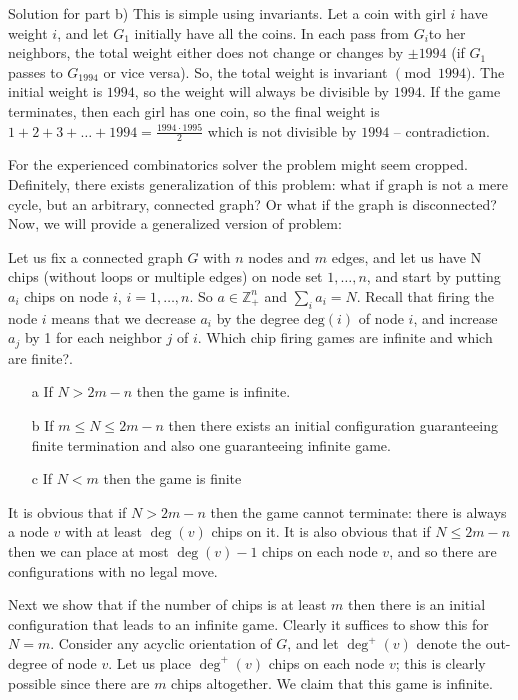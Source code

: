 Solution for part b) This is simple using invariants. Let a coin with girl $i$ have weight $i$, and let $G_1$ initially have all the coins. In each pass from $G_i$to her neighbors, the total weight either does not change or changes by $\pm 1994$ (if $G_1$ passes to $G_{1994}$ or vice versa). So, the total weight is invariant $\pmod{1994}$. The initial weight is $1994$, so the weight will always be divisible by $1994$. If the game terminates, then each girl has one coin, so the final weight is $1+2+3+\dots+1994 = \frac{1994\cdot1995}{2}$ which is not divisible by $1994$ -- contradiction.

For the experienced combinatorics solver the problem might seem cropped. Definitely, there exists generalization of this problem: what if graph is not a mere cycle, but an arbitrary, connected graph? Or what if the graph is disconnected? Now, we will provide a generalized version of problem:

\begin{example}
    Let us fix a connected graph \( G \) with $n$ nodes and $m$ edges, and let us have N chips (without loops or multiple edges) on node set \( 1, \dots, n \), and start by putting \( a_i \) chips on node \( i \), \( i = 1, \dots, n \). So \( a \in \mathbb{Z}^n_+ \) and \( \sum_i a_i = N \). Recall that firing the node \( i \) means that we decrease \( a_i \) by the degree \( \text{deg}(i) \) of node \( i \), and increase \( a_j \) by 1 for each neighbor \( j \) of \( i \).  Which chip firing games are infinite and which are finite?.
\end{example}

\sol 

\begin{itemize}
    \item[a] If $N > 2m - n$ then the game is infinite.
    \item[b] If $m \leq N \leq 2m - n$ then there exists an initial configuration guaranteeing finite termination and also one guaranteeing infinite game.
    \item[c] If $N < m$ then the game is finite
\end{itemize}

It is obvious that if $N > 2m-n$ then the game cannot terminate: there is always a node $v$ with at least $\deg(v)$ chips on it. It is also obvious that if $N \leq 2m-n$ then we can place at most $\deg(v)-1$ chips on each node $v$, and so there are configurations with no legal move.

Next we show that if the number of chips is at least $m$ then there is an initial configuration that leads to an infinite game. Clearly it suffices to show this for $N=m$. Consider any acyclic orientation of $G$, and let $\deg^+(v)$ denote the out-degree of node $v$. Let us place $\deg^+(v)$ chips on each node $v$; this is clearly possible since there are $m$ chips altogether. We claim that this game is infinite.


